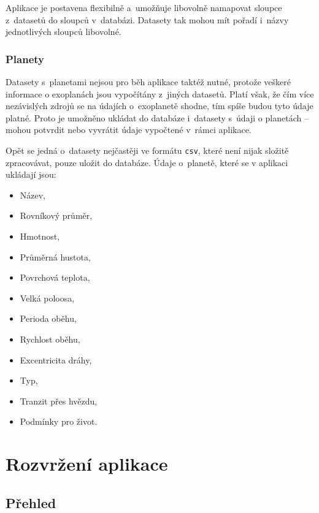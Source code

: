 \documentclass[a4paper,12pt]{article}
\def\code#1{\texttt{#1}}
\begin{document}
{{Aplikace je postavena flexibilně a~umožňuje libovolně namapovat sloupce z~datasetů do sloupců v~databázi. Datasety tak mohou mít pořadí i~názvy jednotlivých sloupců libovolné.


\subsubsection{Planety}

Datasety s~planetami nejsou pro běh aplikace taktéž nutné, protože veškeré informace o exoplanách jsou vypočítány z~jiných datasetů. Platí však, že čím více nezávislých zdrojů se na údajích o~exoplanetě shodne, tím spíše budou tyto údaje platné. Proto je umožněno ukládat do databáze i~datasety s~údaji o planetách -- mohou potvrdit nebo vyvrátit údaje vypočtené v~rámci aplikace.


Opět se jedná o~datasety nejčastěji ve formátu \code{csv}, které není nijak složitě zpracovávat, pouze uložit do databáze. Údaje o~planetě, které se v aplikaci ukládají jsou:

\begin{multicols}{3}
\begin{itemize}
\item Název,
\item Rovníkový průměr,
\item Hmotnost,
\item Průměrná hustota,
\item Povrchová teplota,
\item Velká poloosa,
\item Perioda oběhu,
\item Rychlost oběhu,
\item Excentricita dráhy,
\item Typ,
\item Tranzit přes hvězdu,
\item Podmínky pro život.
\end{itemize}
\end{multicols}

\section{Rozvržení aplikace}

\subsection{Přehled}

}}
\end{document}
